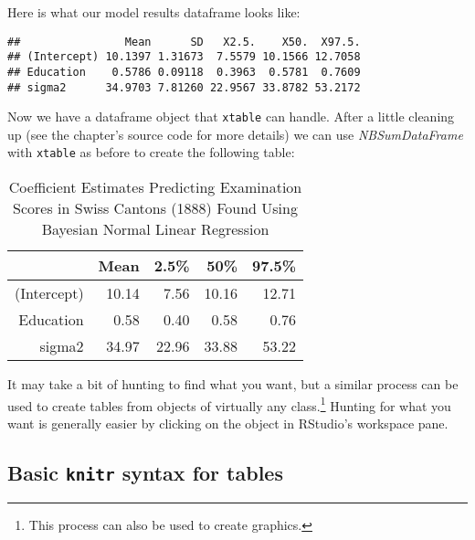\documentclass[ChapterTOCs,krantz1]{krantz}\usepackage{graphicx, color}
\makeatletter
\newenvironment{kframe}{%
 \def\at@end@of@kframe{}%
 \ifinner\ifhmode%
  \def\at@end@of@kframe{\end{minipage}}%
  \begin{minipage}{\columnwidth}%
 \fi\fi%
 \def\FrameCommand##1{\hskip\@totalleftmargin \hskip-\fboxsep
 \colorbox{shadecolor}{##1}\hskip-\fboxsep
     \hskip-\linewidth \hskip-\@totalleftmargin \hskip\columnwidth}%
 \MakeFramed {\advance\hsize-\width
   \@totalleftmargin\z@ \linewidth\hsize
   \@setminipage}}%
 {\par\unskip\endMakeFramed%
 \at@end@of@kframe}
\newenvironment{knitrout}{}{} %
\makeatother
\begin{document}
\noindent Here is what our model results dataframe looks like:

\begin{knitrout}
\color{fgcolor}\begin{kframe}
\begin{verbatim}
##                Mean      SD   X2.5.    X50.  X97.5.
## (Intercept) 10.1397 1.31673  7.5579 10.1566 12.7058
## Education    0.5786 0.09118  0.3963  0.5781  0.7609
## sigma2      34.9703 7.81260 22.9567 33.8782 53.2172
\end{verbatim}
\end{kframe}
\end{knitrout}


\noindent Now we have a dataframe object that {\tt{xtable}} can handle. After a little cleaning up (see the chapter's source code for more details) we can use {\emph{NBSumDataFrame}} with {\tt{xtable}} as before to create the following table:
\vspace{0.5cm}


\begin{table}[ht]
\begin{center}
\begin{tabular}{rrrrr}
  \hline
 & Mean & 2.5\% & 50\% & 97.5\% \\ 
  \hline
(Intercept) & 10.14 & 7.56 & 10.16 & 12.71 \\ 
  Education & 0.58 & 0.40 & 0.58 & 0.76 \\ 
  sigma2 & 34.97 & 22.96 & 33.88 & 53.22 \\ 
   \hline
\end{tabular}
\caption{Coefficient Estimates Predicting Examination Scores in Swiss Cantons (1888) Found Using Bayesian Normal Linear Regression}
\end{center}
\end{table}




It may take a bit of hunting to find what you want, but a similar process can be used to create tables from objects of virtually any class.\footnote{This process can also be used to create graphics.} Hunting for what you want is generally easier by clicking on the object in RStudio's workspace pane.

\subsection{Basic \texttt{knitr} syntax for tables}
\end{document}

